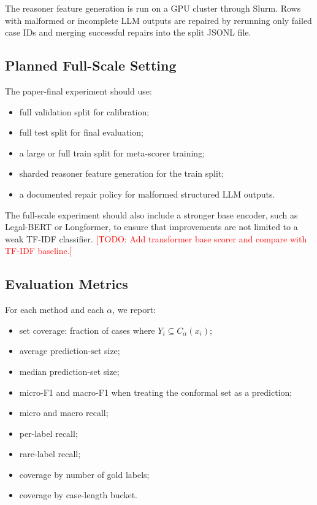 \documentclass[11pt]{article}
\newcommand{\todo}[1]{\textcolor{red}{[TODO: #1]}}
\begin{document}
The reasoner feature generation is run on a GPU cluster through Slurm. Rows with malformed or incomplete LLM outputs are repaired by rerunning only failed case IDs and merging successful repairs into the split JSONL file.

\subsection{Planned Full-Scale Setting}

The paper-final experiment should use:
\begin{itemize}
  \item full validation split for calibration;
  \item full test split for final evaluation;
  \item a large or full train split for meta-scorer training;
  \item sharded reasoner feature generation for the train split;
  \item a documented repair policy for malformed structured LLM outputs.
\end{itemize}

The full-scale experiment should also include a stronger base encoder, such as Legal-BERT or Longformer, to ensure that improvements are not limited to a weak TF-IDF classifier. \todo{Add transformer base scorer and compare with TF-IDF baseline.}

\subsection{Evaluation Metrics}

For each method and each $\alpha$, we report:
\begin{itemize}
  \item set coverage: fraction of cases where $Y_i \subseteq C_\alpha(x_i)$;
  \item average prediction-set size;
  \item median prediction-set size;
  \item micro-F1 and macro-F1 when treating the conformal set as a prediction;
  \item micro and macro recall;
  \item per-label recall;
  \item rare-label recall;
  \item coverage by number of gold labels;
  \item coverage by case-length bucket.
\end{itemize}
\end{document}
